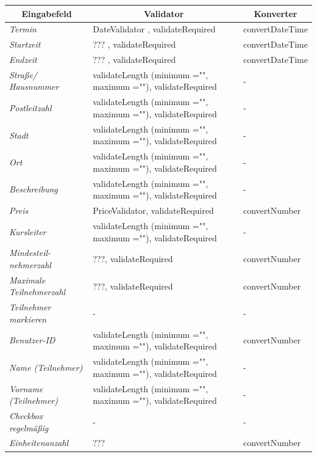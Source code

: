 \begin{itemize}
				\begin{center}
					\begin{longtable}{|p{3cm} |p{8cm} | p{5cm}|}
						
						\hline \multicolumn{1}{|c|}{\textbf{Eingabefeld}} & \multicolumn{1}{|c|}{\textbf{Validator}} & \multicolumn{1}{|c|}{\textbf{Konverter}} \\ \hline
						\endfirsthead
						\hline
						\endlastfoot
						\textit{Termin} & DateValidator , validateRequired & convertDateTime \\ \hline
						\textit{Startzeit} & ??? , validateRequired & convertDateTime \\ \hline
						\textit{Endzeit} & ??? , validateRequired & convertDateTime \\ \hline
						\textit{Straße/ Hausnummer} & validateLength (minimum ="", maximum =""), validateRequired & - \\ \hline
						\textit{Postleitzahl} & validateLength (minimum ="", maximum =""), validateRequired & - \\ \hline
						\textit{Stadt} & validateLength (minimum ="", maximum =""), validateRequired & -  \\ \hline
						\textit{Ort} & validateLength (minimum ="", maximum =""), validateRequired & -  \\ \hline
						\textit{Beschreibung} & validateLength (minimum ="", maximum =""), validateRequired & - \\ \hline
						\textit{Preis} & PriceValidator, validateRequired  & convertNumber \\ \hline
						\textit{Kursleiter} & validateLength (minimum ="", maximum =""), validateRequired & -  \\ \hline
						\textit{Mindesteil- nehmerzahl} & ???, validateRequired & convertNumber \\ \hline
						\textit{Maximale Teilnehmerzahl} & ???, validateRequired & convertNumber \\ \hline
						\textit{Teilnehmer markieren} & - & - \\ \hline
						\textit{Benutzer-ID} & validateLength (minimum ="", maximum =""), validateRequired & convertNumber \\ \hline
						\textit{Name (Teilnehmer)} & validateLength (minimum ="", maximum =""), validateRequired & - \\ \hline
						\textit{Vorname (Teilnehmer)} & validateLength (minimum ="", maximum =""), validateRequired & - \\ \hline
						\textit{Checkbox regelmäßig} & - & - \\ \hline
						\textit{Einheitenanzahl} & ??? & convertNumber \\ \hline
					\end{longtable}
				\end{center}
				

\end{itemize}
